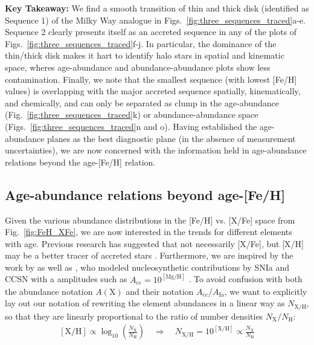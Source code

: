 \documentclass[fleqn,usenatbib]{mnras}
\begin{document}
\textbf{Key Takeaway:} We find a smooth transition of thin and thick disk (identified as Sequence 1) of the Milky Way analogue in Figs.~\ref{fig:three_sequences_traced}a-e. Sequence 2 clearly presents itself as an accreted sequence in any of the plots of Figs.~\ref{fig:three_sequences_traced}f-j. In particular, the dominance of the thin/thick disk makes it hart to identify halo stars in spatial and kinematic space, wheres age-abundance and abundance-abundance plots show less contamination. Finally, we note that the smallest sequence (with lowest [Fe/H] values) is overlapping with the major accreted sequence spatially, kinematically, and chemically, and can only be separated as clump in the age-abundance (Fig.~\ref{fig:three_sequences_traced}k) or abundance-abundance space (Figs.~\ref{fig:three_sequences_traced}n and o). Having established the age-abundance planes as the best diagnostic plane (in the absence of measurement uncertainties), we are now concerned with the information held in age-abundance relations beyond the age-[Fe/H] relation.

\subsection{Age-abundance relations beyond age-[Fe/H]} \label{sec:age-abundance-sequences}

Given the various abundance distributions in the [Fe/H] vs. [X/Fe] space from Fig.~\ref{fig:FeH_XFe}, we are now interested in the trends for different elements with age. Previous research has suggested that not necessarily [X/Fe], but [X/H] may be a better tracer of accreted stars \citep[e.g.][for {[Mg/H]}]{Fuhrmann2017, Feuillet2021}. Furthermore, we are inspired by the work by \citet{Weinberg2019, Weinberg2021} as well as \cite{Griffith2019, Griffith2022}, who modeled nucleosynthetic contributions by SNIa and CCSN with a amplitudes such as $A_\text{cc} = 10^\mathrm{[Mg/H]}$ \citep{Weinberg2019}. To avoid confusion with both the abundance notation $A(\mathrm{X})$ and their notation $A_\mathrm{cc}$/$A_\mathrm{Ia}$, we want to explicitly lay out our notation of rewriting the element abundances in a linear way as $N_\text{X/H}$, so that they are linearly proportional to the ratio of number densities $N_\text{X}/N_\text{H}$:
\begin{align}
    \left[\text{X/H}\right] \varpropto \log_{10}\left(\frac{N_\text{X}}{N_\text{H}}\right) \quad \Rightarrow \quad N_\text{X/H} = 10^{\mathrm{[X/H]}} \varpropto \frac{N_\text{X}}{N_\text{H}}
\end{align}
\end{document}
